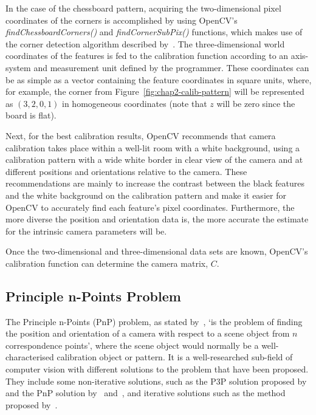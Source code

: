 In the case of the chessboard pattern, acquiring the two-dimensional pixel coordinates of the corners is accomplished by using OpenCV's \emph{findChessboardCorners()} and \emph{findCornerSubPix()} functions, which makes use of the corner detection algorithm described by~\cite{harris1988combined}. The three-dimensional world coordinates of the features is fed to the calibration function according to an axis-system and measurement unit defined by the programmer. These coordinates can be as simple as a vector containing the feature coordinates in square units, where, for example, the corner from Figure~\ref{fig:chap2-calib-pattern} will be represented as $(3, 2, 0, 1)$ in homogeneous coordinates (note that $z$ will be zero since the board is flat). 

Next, for the best calibration results, OpenCV recommends that camera calibration takes place within a well-lit room with a white background, using a calibration pattern with a wide white border in clear view of the camera and at different positions and orientations relative to the camera. These recommendations are mainly to increase the contrast between the black features and the white background on the calibration pattern and make it easier for OpenCV to accurately find each feature's pixel coordinates. Furthermore, the more diverse the position and orientation data is, the more accurate the estimate for the intrinsic camera parameters will be. 

Once the two-dimensional and three-dimensional data sets are known, OpenCV's calibration function can determine the camera matrix, $C$. 

\subsection{Principle n-Points Problem}

The Principle n-Points (PnP) problem, as stated by~\cite{horaud1989analytic}, `is the problem of finding the position and orientation of a camera with respect to a scene object from $n$ correspondence points', where the scene object would normally be a well-characterised calibration object or pattern. It is a well-researched sub-field of computer vision with different solutions to the problem that have been proposed. They include some non-iterative solutions, such as the P3P solution proposed by~\cite{gao2003complete} and the PnP solution by~\cite{lepetit2009epnp} and~\cite{schweighofer2006robust}, and iterative solutions such as the method proposed by~\cite{lu2000fast}.

